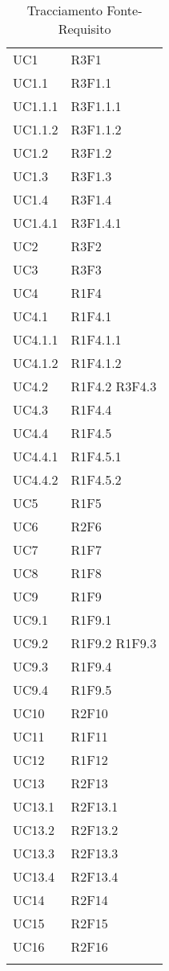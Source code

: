 \begin{longtable} {
		>{\centering}p{28mm}  
		>{}p{20mm}
		}
		UC1 & R3F1 \TBstrut \\ [2mm]
		UC1.1 & R3F1.1 \TBstrut \\ [2mm]
		UC1.1.1 & R3F1.1.1 \TBstrut \\ [2mm]
		UC1.1.2 & R3F1.1.2 \TBstrut \\ [2mm]
		UC1.2 & R3F1.2 \TBstrut \\ [2mm]
		UC1.3 & R3F1.3 \TBstrut \\ [2mm]
		UC1.4 & R3F1.4 \TBstrut \\ [2mm]
		UC1.4.1 & R3F1.4.1 \TBstrut \\ [2mm]
		UC2 & R3F2 \TBstrut \\ [2mm]
		UC3 & R3F3 \TBstrut \\ [2mm]
		UC4 & R1F4 \TBstrut \\ [2mm]
		UC4.1 & R1F4.1 \TBstrut \\ [2mm]
		UC4.1.1 & R1F4.1.1 \TBstrut \\ [2mm]
		UC4.1.2 & R1F4.1.2 \TBstrut \\ [2mm]
		UC4.2 & R1F4.2 R3F4.3 \TBstrut \\ [2mm]
		UC4.3 & R1F4.4 \TBstrut \\ [2mm]
		UC4.4 & R1F4.5 \TBstrut \\ [2mm]
		UC4.4.1 & R1F4.5.1 \TBstrut \\ [2mm]
		UC4.4.2 & R1F4.5.2 \TBstrut \\ [2mm]
		UC5 & R1F5 \TBstrut \\ [2mm]
		UC6 & R2F6 \TBstrut \\ [2mm]
		UC7 & R1F7 \TBstrut \\ [2mm]
		UC8 & R1F8 \TBstrut \\ [2mm]
		UC9 & R1F9 \TBstrut \\ [2mm]
		UC9.1 & R1F9.1 \TBstrut \\ [2mm]
		UC9.2 & R1F9.2 R1F9.3 \TBstrut \\ [2mm]
		UC9.3 & R1F9.4 \TBstrut \\ [2mm]
		UC9.4 & R1F9.5 \TBstrut \\ [2mm]
		UC10 & R2F10 \TBstrut \\ [2mm]
		UC11 & R1F11 \TBstrut \\ [2mm]
		UC12 & R1F12 \TBstrut \\ [2mm]
		UC13 & R2F13 \TBstrut \\ [2mm]
		UC13.1 & R2F13.1 \TBstrut \\ [2mm]
		UC13.2 & R2F13.2 \TBstrut \\ [2mm]
		UC13.3 & R2F13.3 \TBstrut \\ [2mm]
		UC13.4 & R2F13.4 \TBstrut \\ [2mm]
		UC14 & R2F14 \TBstrut \\ [2mm]
		UC15 & R2F15 \TBstrut \\ [2mm]
		UC16 & R2F16 \TBstrut \\ [2mm]	
		\rowcolor{white}
		\caption{Tracciamento Fonte-Requisito}
	\end{longtable}

